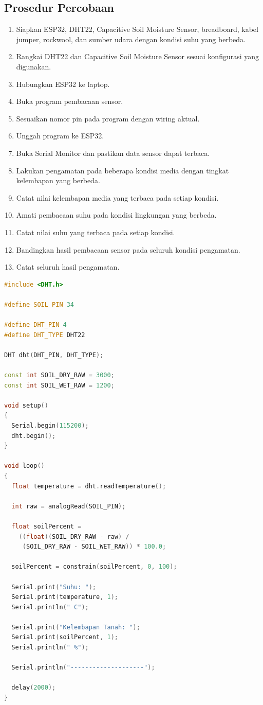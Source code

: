 \documentclass[12pt,a4paper]{article}
\begin{document}
\subsection{Prosedur Percobaan}

\begin{enumerate}
    \item Siapkan ESP32, DHT22, Capacitive Soil Moisture Sensor, breadboard, kabel jumper, rockwool, dan sumber udara dengan kondisi suhu yang berbeda.
    \item Rangkai DHT22 dan Capacitive Soil Moisture Sensor sesuai konfigurasi yang digunakan.
    \item Hubungkan ESP32 ke laptop.
    \item Buka program pembacaan sensor.
    \item Sesuaikan nomor pin pada program dengan wiring aktual.
    \item Unggah program ke ESP32.
    \item Buka Serial Monitor dan pastikan data sensor dapat terbaca.
    \item Lakukan pengamatan pada beberapa kondisi media dengan tingkat kelembapan yang berbeda.
    \item Catat nilai kelembapan media yang terbaca pada setiap kondisi.
    \item Amati pembacaan suhu pada kondisi lingkungan yang berbeda.
    \item Catat nilai suhu yang terbaca pada setiap kondisi.
    \item Bandingkan hasil pembacaan sensor pada seluruh kondisi pengamatan.
    \item Catat seluruh hasil pengamatan.
\end{enumerate}

\begin{lstlisting}[language=C++, caption={Program pembacaan sensor untuk Percobaan 1}, label={lst:percobaan1}]
#include <DHT.h>

#define SOIL_PIN 34

#define DHT_PIN 4
#define DHT_TYPE DHT22

DHT dht(DHT_PIN, DHT_TYPE);

const int SOIL_DRY_RAW = 3000;
const int SOIL_WET_RAW = 1200;

void setup()
{
  Serial.begin(115200);
  dht.begin();
}

void loop()
{
  float temperature = dht.readTemperature();

  int raw = analogRead(SOIL_PIN);

  float soilPercent =
    ((float)(SOIL_DRY_RAW - raw) /
     (SOIL_DRY_RAW - SOIL_WET_RAW)) * 100.0;

  soilPercent = constrain(soilPercent, 0, 100);

  Serial.print("Suhu: ");
  Serial.print(temperature, 1);
  Serial.println(" C");

  Serial.print("Kelembapan Tanah: ");
  Serial.print(soilPercent, 1);
  Serial.println(" %");

  Serial.println("--------------------");

  delay(2000);
}
\end{lstlisting}
\end{document}
